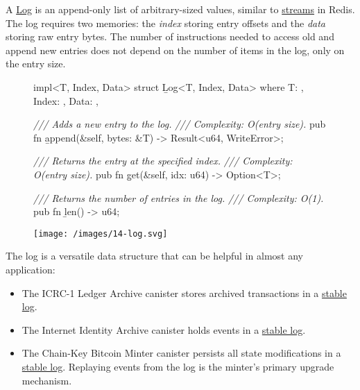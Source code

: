 \documentclass{article}
\begin{document}
A \href{https://docs.rs/ic-stable-structures/latest/ic_stable_structures/log/struct.Log.html}{Log} is an append-only list of arbitrary-sized values, similar to \href{https://redis.io/docs/data-types/streams/}{streams} in Redis.
The log requires two memories: the \emph{index} storing entry offsets and the \emph{data} storing raw entry bytes.
The number of instructions needed to access old and append new entries does not depend on the number of items in the log, only on the entry size.

\begin{figure}
\begin{code}[rust]
impl<T, Index, Data> struct \b{Log}<T, Index, Data>
where
  T: \href{#storable-trait}{},
  Index: \href{#memory}{},
  Data: \href{#memory}{},
{
    \emph{/// Adds a new entry to the log.}
    \emph{/// Complexity: O(entry size).}
    pub fn \b{append}(&self, bytes: &T) -> Result<u64, WriteError>;

    \emph{/// Returns the entry at the specified index.}
    \emph{/// Complexity: O(entry size).}
    pub fn \b{get}(&self, idx: u64) -> Option<T>;

    \emph{/// Returns the number of entries in the log.}
    \emph{/// Complexity: O(1).}
    pub fn \b{len}() -> u64;
}
\end{code}
\end{figure}
\begin{figure}[grayscale-diagram]
  \texttt{[image: /images/14-log.svg]}
\end{figure}

The log is a versatile data structure that can be helpful in almost any application:
\begin{itemize}
  \item
    The ICRC-1 Ledger Archive canister stores archived transactions in a \href{https://github.com/dfinity/ic/blob/9cdb1e62bcd199f28ae0005ed3f762487a1454df/rs/rosetta-api/icrc1/archive/src/main.rs#L58}{stable log}.
  \item
    The Internet Identity Archive canister holds events in a \href{https://github.com/dfinity/internet-identity/blob/b66fe925fb0a337b09aaaa5beaf1a60994b19f14/src/archive/src/main.rs#L90}{stable log}.
  \item
    The Chain-Key Bitcoin Minter canister persists all state modifications in a \href{https://github.com/dfinity/ic/blob/6cc83edf2cad91ca1bdbe8f7965060a9ef1d1960/rs/bitcoin/ckbtc/minter/src/storage.rs#L21}{stable log}.
    Replaying events from the log is the minter's primary upgrade mechanism.
\end{itemize}
\end{document}
